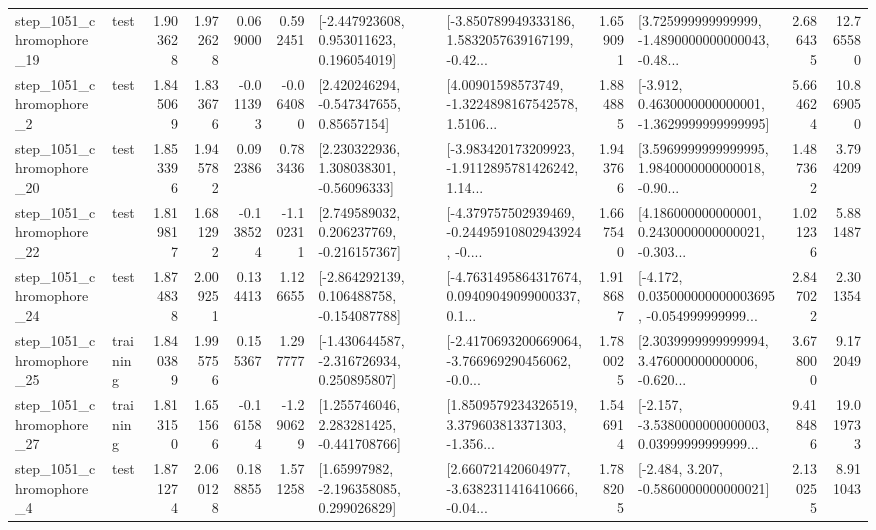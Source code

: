 \begin{tabular}{llrrrrllrlrr}
 step\_1051\_chromophore\_19 &      test &      1.903628 &    1.972628 &      0.069000 &  0.592451 &    [-2.447923608, 0.953011623, 0.196054019] &  [-3.850789949333186, 1.5832057639167199, -0.42... &       1.659091 &  [3.725999999999999, -1.4890000000000043, -0.48... &            2.686435 &         12.765580 \\
  step\_1051\_chromophore\_2 &      test &      1.845069 &    1.833676 &     -0.011393 & -0.064080 &     [2.420246294, -0.547347655, 0.85657154] &  [4.00901598573749, -1.3224898167542578, 1.5106... &       1.884885 &  [-3.912, 0.4630000000000001, -1.3629999999999995] &            5.664624 &         10.869050 \\
 step\_1051\_chromophore\_20 &      test &      1.853396 &    1.945782 &      0.092386 &  0.783436 &     [2.230322936, 1.308038301, -0.56096333] &  [-3.983420173209923, -1.9112895781426242, 1.14... &       1.943766 &  [3.5969999999999995, 1.9840000000000018, -0.90... &            1.487362 &          3.794209 \\
 step\_1051\_chromophore\_22 &      test &      1.819817 &    1.681292 &     -0.138524 & -1.102311 &    [2.749589032, 0.206237769, -0.216157367] &  [-4.379757502939469, -0.24495910802943924, -0.... &       1.667540 &  [4.186000000000001, 0.2430000000000021, -0.303... &            1.021236 &          5.881487 \\
 step\_1051\_chromophore\_24 &      test &      1.874838 &    2.009251 &      0.134413 &  1.126655 &   [-2.864292139, 0.106488758, -0.154087788] &  [-4.7631495864317674, 0.09409049099000337, 0.1... &       1.918687 &  [-4.172, 0.035000000000003695, -0.054999999999... &            2.847022 &          2.301354 \\
 step\_1051\_chromophore\_25 &  training &      1.840389 &    1.995756 &      0.155367 &  1.297777 &   [-1.430644587, -2.316726934, 0.250895807] &  [-2.4170693200669064, -3.766969290456062, -0.0... &       1.780025 &  [2.3039999999999994, 3.476000000000006, -0.620... &            3.678000 &          9.172049 \\
 step\_1051\_chromophore\_27 &  training &      1.813150 &    1.651566 &     -0.161584 & -1.290629 &    [1.255746046, 2.283281425, -0.441708766] &  [1.8509579234326519, 3.379603813371303, -1.356... &       1.546914 &  [-2.157, -3.5380000000000003, 0.03999999999999... &            9.418486 &         19.019733 \\
  step\_1051\_chromophore\_4 &      test &      1.871274 &    2.060128 &      0.188855 &  1.571258 &     [1.65997982, -2.196358085, 0.299026829] &  [2.660721420604977, -3.6382311416410666, -0.04... &       1.788205 &               [-2.484, 3.207, -0.5860000000000021] &            2.130255 &          8.911043 \\

\end{tabular}
